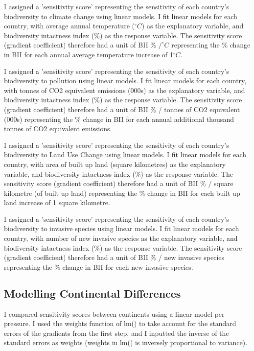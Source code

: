 \documentclass[11pt, a4paper, titlepage]{article}
\begin{document}
	I assigned a 'sensitivity score' representing the sensitivity of each country's biodiversity to climate change using linear models. I fit linear models for each country, with average annual temperature ($^\circ C$) as the explanatory variable, and biodiversity intactness index (\%) as the response variable. The sensitivity score (gradient coefficient) therefore had a unit of BII \% $/ ^\circ C$ representing the \% change in BII for each annual average temperature increase of 1$^\circ C$.
	
	I assigned a 'sensitivity score' representing the sensitivity of each country's biodiversity to pollution using linear models. I fit linear models for each country, with tonnes of CO2 equivalent emissions (000s) as the explanatory variable, and biodiversity intactness index (\%) as the response variable. The sensitivity score (gradient coefficient) therefore had a unit of BII \% / tonnes of CO2 equivalent (000s) representing the \% change in BII for each annual additional thousand tonnes of CO2 equivalent emissions. 
	
	I assigned a 'sensitivity score' representing the sensitivity of each country's biodiversity to Land Use Change using linear models. I fit linear models for each country, with area of built up land (square kilometres) as the explanatory variable, and biodiversity intactness index (\%) as the response variable. The sensitivity score (gradient coefficient) therefore had a unit of BII \% / square kilometre (of built up land) representing the \% change in BII for each built up land increase of 1 square kilometre.
	
	I assigned a 'sensitivity score' representing the sensitivity of each country's biodiversity to invasive species using linear models. I fit linear models for each country, with number of new invasive species as the explanatory variable, and biodiversity intactness index (\%) as the response variable. The sensitivity score (gradient coefficient) therefore had a unit of BII \% / new invasive species representing the \% change in BII for each new invasive species. 

	\subsection*{Modelling Continental Differences}
	
	I compared sensitivity scores between continents using a linear model per pressure. I used the weights function of lm() to take account for the standard errors of the gradients from the first step, and I inputted the inverse of the standard errors as weights (weights in lm() is inversely proportional to variance).  
	
\end{document}
